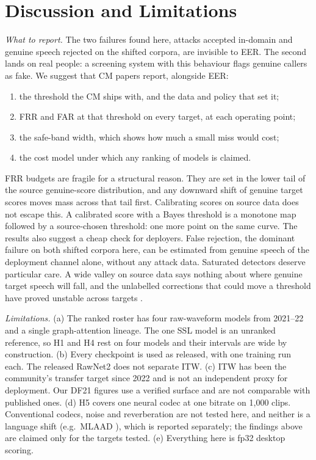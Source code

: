 \documentclass[conference]{IEEEtran}
\begin{document}
\section{Discussion and Limitations}
\label{sec:discussion}
\emph{What to report.} The two failures found here, attacks accepted in-domain
and genuine speech rejected on the shifted corpora, are invisible to EER. The second lands
on real people: a screening system with this behaviour flags genuine callers as
fake. We suggest that CM papers report, alongside EER:
\begin{enumerate}
\item the threshold the CM ships with, and the data and policy that set it;
\item FRR and FAR at that threshold on every target, at each operating point;
\item the safe-band width, which shows how much a small miss would cost;
\item the cost model under which any ranking of models is claimed.
\end{enumerate}
FRR budgets are fragile for a structural reason. They are set in the lower tail
of the source genuine-score distribution, and any downward shift of genuine
target scores moves mass across that tail first. Calibrating scores on source
data does not escape this. A calibrated score with a Bayes threshold
\cite{brummer06_calibration} is a monotone map followed by a source-chosen
threshold: one more point on the same curve. The results also suggest a
cheap check for deployers. False rejection, the dominant failure on both shifted corpora here,
can be estimated from genuine speech of the deployment channel alone, without
any attack data. Saturated detectors deserve particular care. A wide valley on
source data says nothing about where genuine target speech will fall, and the
unlabelled corrections that could move a threshold have proved unstable across
targets \cite{zhou26_eer_hides}.

\emph{Limitations.} (a) The ranked roster has four raw-waveform models from
2021--22 and a single graph-attention lineage. The one SSL model is an unranked
reference, so H1 and H4 rest on four models and their intervals are wide by
construction. (b) Every checkpoint is used as released, with one training run
each. The released RawNet2 does not separate ITW. (c) ITW has been the
community's transfer target since 2022 and is not an independent proxy for
deployment. Our DF21 figures use a verified surface and are not comparable with
published ones. (d) H5 covers one neural codec at one bitrate on 1,000 clips.
Conventional codecs, noise and reverberation are not tested here, and neither is
a language shift (e.g.\ MLAAD \cite{mlaad24}), which is reported separately; the
findings above are claimed only for the targets tested. (e) Everything here is fp32
desktop scoring.
\end{document}

